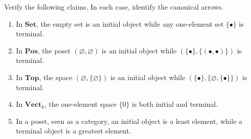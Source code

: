 \documentclass[]{amsbook}
\newcommand{\catname}[1]{\mathbf{#1}}
\newcommand{\0}{\mathbf{0}}
\newcommand{\1}{\mathbf{1}}
\renewcommand{\emptyset}{\varnothing}
\begin{document}
\setcounter{Exercise}{17}
\begin{Exercise}
    Verify the following claims. In each case, identify the canonical arrows.
    \begin{enumerate}
        \item In $\catname{Set}$, the empty set is an initial object while any
        one-element set $\{ \bullet \}$ is terminal.
        \item In $\catname{Pos}$, the poset $(\emptyset, \emptyset)$ is an
        initial object while $(\{ \bullet \}, \{ (\bullet, \bullet) \})$ is
        terminal.
        \item In $\catname{Top}$,  the space $(\emptyset, \{ \emptyset \})$ is
        an initial object while $(\{ \bullet \}, \{ \emptyset, \{ \bullet \} \})$
        is terminal.
        \item In $\catname{Vect}_k$, the one-element space $\{ 0 \}$ is both
        initial and terminal.
        \item In a poset, seen as a category, an initial object is a least
        element, while a terminal object is a greatest element.
    \end{enumerate}
\end{Exercise}
\end{document}
